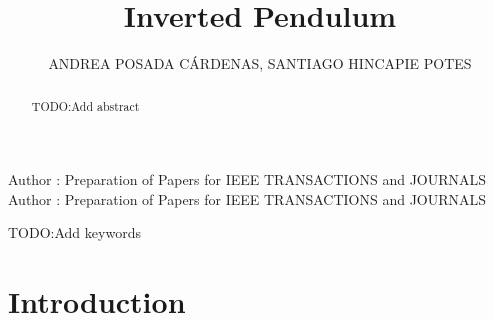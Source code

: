 \documentclass{ieeeaccess}
\begin{document}

\title{Inverted Pendulum}
\author{\uppercase{Andrea Posada Cárdenas},
  \uppercase{Santiago Hincapie Potes}}
\address[1]{Mathematical Engineering Student, Universidad EAFIT,
  Medellin, Colombia (e-mail: aposad31@eafit.edu.co)}
\address[2]{Mathematical Engineering Student, Universidad EAFIT,
  Medellin, Colombia (e-mail: shinca12@eafit.edu.co)}

\markboth
{Author \headeretal: Preparation of Papers for IEEE TRANSACTIONS and JOURNALS}
{Author \headeretal: Preparation of Papers for IEEE TRANSACTIONS and JOURNALS}


\begin{abstract}
  TODO:Add abstract
\end{abstract}

\begin{keywords}
  TODO:Add keywords
\end{keywords}

\titlepgskip=-15pt

\maketitle

\section{Introduction}
\label{sec:introduction}

\EOD
\end{document}

